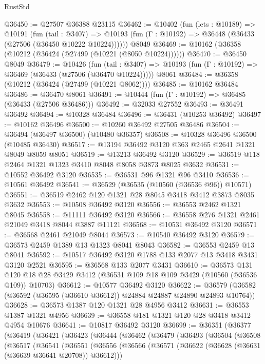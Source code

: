 \begin{lexlean}{RustStd}
\begin{coremodule}
@36450 := @27507 @36388 @23115
@36462 := @10402
    (fun (lets : @10189) =>
    @10191
      (fun (tail : @3407) =>
      @10193 (fun (Γ : @10192) => @36448 (@36433 (@27506 (@36450 @10222 @10224))))))
    @8049
@36469 := @10162 (@36358 (@10212 (@36424 (@27499 (@10221 (@8050 @10224))))))
@36470 := @36450 @8049
@36479 := @10426
    (fun (tail : @3407) => @10193 (fun (Γ : @10192) => @36469 (@36433 (@27506 (@36470 @10224)))))
    @8061
@36484 := @36358 (@10212 (@36424 (@27499 (@10221 @8062))))
@36485 := @10162 @36484
@36486 := @36470 @8061
@36491 := @10444 (fun (Γ : @10192) => @36485 (@36433 (@27506 @36486)))
@36492 := @32033 @27552
@36493 := @36491 @36492
@36494 := @10328 @36484
@36496 := @36431 (@10253 @36492)
@36497 := @10162 @36496
@36500 := @10260 @36492 @27505 @36486
@36504 := @36494 (@36497 @36500) (@10480 @36357)
@36508 := @10328 @36496 @36500 (@10485 @36430)
@36517 := @13194 @36492 @3120 @363 @2465 @2641 @1321 @8049 @8059 @8051
@36519 := @13213 @36492 @3120
@36529 := @36519 @118 @2464 @1321 @1323 @3410 @8048 @8058 @3873 @8025 @3632
@36531 := @10552 @36492 @3120
@36535 := @36531 @96 @1321 @96 @3410
@36536 := @10561 @36492
@36541 := @36529 (@36535 (@10560 (@36536 @96)) @10571)
@36551 := @36519 @2462 @120 @1321 @28 @8045 @3418 @3412 @3873 @8035 @3632
@36553 := @10508 @36492 @3120
@36556 := @36553 @2462 @1321 @8045
@36558 := @11111 @36492 @3120
@36566 := @36558 @276 @1321 @2461 @21049 @3418 @8044 @3887 @11121
@36568 := @10531 @36492 @3120
@36571 := @36568 @2461 @21049 @8044
@36573 := @10540 @36492 @3120
@36579 := @36573 @2459 @1389 @13 @1323 @8041 @8043
@36582 := @36553 @2459 @13 @8041
@36592 := @10517 @36492 @3120 @1788 @133 @2077 @13 @3418 @3431 @3120 @2521
@36595 := @36568 @133 @2077 @3431
@36610 := @36573
    @131
    @120
    @18
    @28
    @3429
    @3412
    (@36531 @109 @18 @109 @3429 (@10560 (@36536 @109)) @10703)
@36612 := @10577 @36492 @3120
@36622 := @36579 (@36582 (@36592 (@36595 (@36610 @36612)) @24884 @24887 @24890 @24893 @10764))
@36628 := @36573 @1387 @120 @1321 @28 @4956 @3412
@36631 := @36553 @1387 @1321 @4956
@36639 := @36558 @181 @1321 @120 @28 @3418 @3412 @4954 @10676
@36641 := @10817 @36492 @3120
@36699 := @36351
    (@36377
      (@36419
        (@36421
          (@36423
            (@36444
              (@36462
                (@36479
                  (@36493
                    (@36504
                      (@36508
                        (@36517
                          (@36541
                            (@36551
                              (@36556
                                (@36566
                                  (@36571 (@36622 (@36628 (@36631 (@36639 @36641 @20708)) @36612)))

\end{coremodule}
\end{lexlean}
